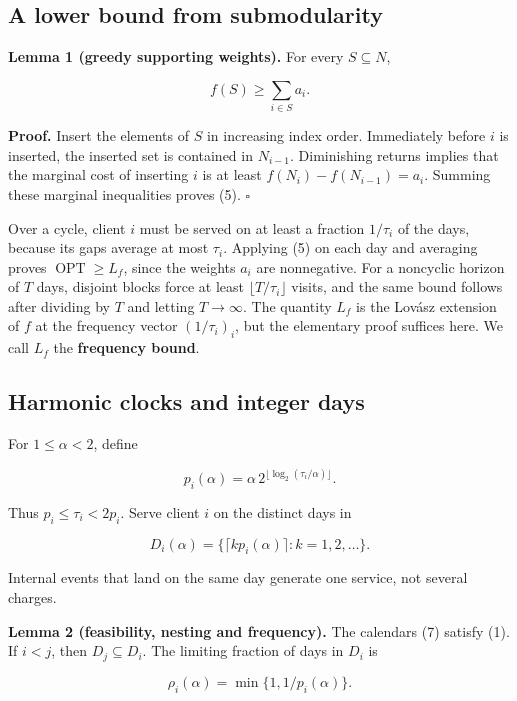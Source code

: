 \documentclass[
  british,
  11pt,
  a4paper,
]{article}
\begin{document}
\subsection{A lower bound from
submodularity}\label{a-lower-bound-from-submodularity}

\textbf{Lemma 1 (greedy supporting weights).} For every
\(S\subseteq N\),

\[
f(S)\ge\sum_{i\in S}a_i. \tag{5}
\]

\textbf{Proof.} Insert the elements of \(S\) in increasing index order.
Immediately before \(i\) is inserted, the inserted set is contained in
\(N_{i-1}\). Diminishing returns implies that the marginal cost of
inserting \(i\) is at least \(f(N_i)-f(N_{i-1})=a_i\). Summing these
marginal inequalities proves (5). \(\square\)

Over a cycle, client \(i\) must be served on at least a fraction
\(1/\tau_i\) of the days, because its gaps average at most \(\tau_i\).
Applying (5) on each day and averaging proves
\(\operatorname{OPT}\ge L_f\), since the weights \(a_i\) are
nonnegative. For a noncyclic horizon of \(T\) days, disjoint blocks
force at least \(\lfloor T/\tau_i\rfloor\) visits, and the same bound
follows after dividing by \(T\) and letting \(T\to\infty\). The quantity
\(L_f\) is the Lovász extension of \(f\) at the frequency vector
\((1/\tau_i)_i\), but the elementary proof suffices here. We call
\(L_f\) the \textbf{frequency bound}.

\subsection{Harmonic clocks and integer
days}\label{harmonic-clocks-and-integer-days}

For \(1\le\alpha<2\), define

\[
p_i(\alpha)=\alpha\,2^{\lfloor\log_2(\tau_i/\alpha)\rfloor}. \tag{6}
\]

Thus \(p_i\le\tau_i<2p_i\). Serve client \(i\) on the distinct days in

\[
D_i(\alpha)=\{\lceil k p_i(\alpha)\rceil:k=1,2,\ldots\}. \tag{7}
\]

Internal events that land on the same day generate one service, not
several charges.

\textbf{Lemma 2 (feasibility, nesting and frequency).} The calendars (7)
satisfy (1). If \(i<j\), then \(D_j\subseteq D_i\). The limiting
fraction of days in \(D_i\) is

\[
\rho_i(\alpha)=\min\{1,1/p_i(\alpha)\}. \tag{8}
\]
\end{document}
